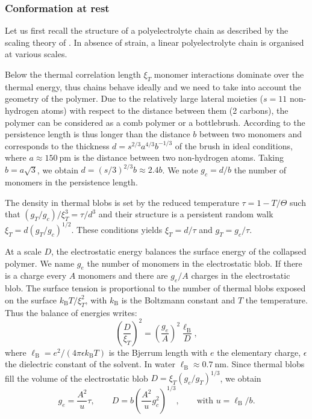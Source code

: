 \documentclass[journal=jacsat,manuscript=article]{achemso}
\begin{document}
\subsubsection{Conformation at rest}

Let us first recall the structure of a polyelectrolyte chain as described by the scaling theory of \citet{Rubinstein1996}. In absence of strain, a linear polyelectrolyte chain is organised at various scales.

Below the thermal correlation length $\xi_T$ monomer interactions dominate over the thermal energy, thus chains behave ideally and we need to take into account the geometry of the polymer. Due to the relatively large lateral moieties ($s=11$ non-hydrogen atoms) with respect to the distance between them (2 carbons), the polymer can be considered as a comb polymer or a bottlebrush. According to \citet{Feuz2005} the persistence length is thus longer than the distance $b$ between two monomers and corresponds to the thickness $d=s^{2/3} a^{4/3}b^{-1/3}$ of the brush in ideal conditions, where $a\approx\SI{150}{\pico\metre}$ is the distance between two non-hydrogen atoms. Taking $b=a\sqrt{3}$, we obtain $d = \left(s/3\right)^{2/3}b \approx 2.4 b$. We note $g_c=d/b$ the number of monomers in the persistence length.

The density in thermal blobs is set by the reduced temperature $\tau= 1-T/\Theta$ such that $(g_T/g_c)/\xi_T^3 = \tau/d^3$ and their structure is a persistent random walk $\xi_T = d (g_T/g_c)^{1/2}$. These conditions yields $\xi_T = d/\tau$ and $g_T = g_c/\tau$.

At a scale $D$, the electrostatic energy balances the surface energy of the collapsed polymer. We name $g_e$ the number of monomers in the electrostatic blob. If there is a charge every $A$ monomers and there are $g_e/A$ charges in the electrostatic blob. The surface tension is proportional to the number of thermal blobs exposed on the surface $k_\mathrm{B}T/\xi_T^2$, with $k_\mathrm{B}$ is the Boltzmann constant and $T$ the temperature. Thus the balance of energies writes:
\begin{equation}
\left(\frac{D}{\xi_T}\right)^2 = \left(\frac{g_e}{A}\right)^2 \frac{\ell_\mathrm{B}}{D},
\label{eq:electrosurface}
\end{equation}
where $\ell_\mathrm{B} = e^2/(4\pi\epsilon k_\mathrm{B}T)$ is the Bjerrum length with $e$ the elementary charge, $\epsilon$ the dielectric constant of the solvent. In water $\ell_\mathrm{B} \approx \SI{0.7}{\nano\metre}$. Since thermal blobs fill the volume of the electrostatic blob $D = \xi_T \left(g_e/g_T\right)^{1/3}$, we obtain
\begin{equation}
g_e = \frac{A^2}{u} \tau, \qquad D = b\left(\frac{A^2}{u}g_c^2\right)^{1/3},\qquad \text{with }u = \ell_\mathrm{B}/b.
\end{equation}
\end{document}
